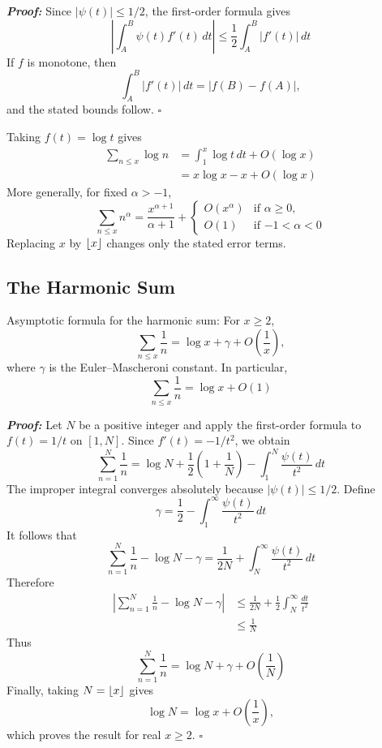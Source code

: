 \documentclass[a4paper,11pt,abstracton]{scrartcl}
\DeclarePairedDelimiter{\floor}{\lfloor}{\rfloor}
\theoremstyle{dotlessP}
\theoremstyle{dotlessS}
\theoremstyle{remark}
\theoremstyle{definition}
\begin{document}
\begin{claim_box}
\textbf{\textit{Proof:}}
Since $|\psi(t)|\leq1/2$, the first-order formula gives
\[
    \left|\int_A^B\psi(t)f'(t)\,dt\right|
      \leq\frac12\int_A^B|f'(t)|\,dt
\]
If $f$ is monotone, then
\[
    \int_A^B|f'(t)|\,dt=|f(B)-f(A)|,
\]
and the stated bounds follow.
\hfill$\square$
\end{claim_box}

\begin{example_box}
Taking $f(t)=\log t$ gives
\begin{align*}
    \sum_{n\leq x}\log n
      &=\int_1^x\log t\,dt+O(\log x)\\
      &=x\log x-x+O(\log x)
\end{align*}
More generally, for fixed $\alpha>-1$,
\[
    \sum_{n\leq x}n^{\alpha}
      =\frac{x^{\alpha+1}}{\alpha+1}
       +
       \begin{cases}
           O(x^{\alpha}) & \text{if $\alpha\geq0$},\\
           O(1) & \text{if $-1<\alpha<0$}
       \end{cases}
\]
Replacing $x$ by $\floor{x}$ changes only the stated error terms.
\end{example_box}


\subsection{The Harmonic Sum}
\label{subsec:harmonic-sum}

\begin{mainbox}{Asymptotic formula for the harmonic sum:}
For $x\geq2$,
\begin{equation}
\label{eq:harmonic-sum}
    \sum_{n\leq x}\frac1n
      =\log x+\gamma+O\!\left(\frac1x\right),
\end{equation}
where $\gamma$ is the Euler--Mascheroni constant. In particular,
\[
    \sum_{n\leq x}\frac1n=\log x+O(1)
\]
\end{mainbox}

\begin{claim_box}
\textbf{\textit{Proof:}}
Let $N$ be a positive integer and apply the first-order formula to
$f(t)=1/t$ on $[1,N]$. Since $f'(t)=-1/t^2$, we obtain
\[
    \sum_{n=1}^{N}\frac1n
      =\log N+\frac12\left(1+\frac1N\right)
       -\int_1^N\frac{\psi(t)}{t^2}\,dt
\]
The improper integral converges absolutely because
$|\psi(t)|\leq1/2$. Define
\[
    \gamma
      =\frac12-\int_1^{\infty}\frac{\psi(t)}{t^2}\,dt
\]
It follows that
\[
    \sum_{n=1}^{N}\frac1n-\log N-\gamma
      =\frac1{2N}
       +\int_N^{\infty}\frac{\psi(t)}{t^2}\,dt
\]
Therefore
\begin{align*}
    \left|
      \sum_{n=1}^{N}\frac1n-\log N-\gamma
    \right|
      &\leq\frac1{2N}
        +\frac12\int_N^{\infty}\frac{dt}{t^2}\\
      &\leq\frac1N
\end{align*}
Thus
\[
    \sum_{n=1}^{N}\frac1n
      =\log N+\gamma+O\!\left(\frac1N\right)
\]
Finally, taking $N=\floor{x}$ gives
\[
    \log N=\log x+O\!\left(\frac1x\right),
\]
which proves the result for real $x\geq2$.
\hfill$\square$
\end{claim_box}
\end{document}
